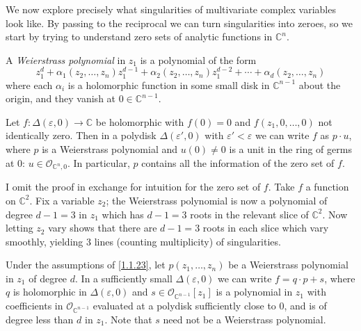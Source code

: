 We now explore precisely what singularities of multivariate complex variables look like. By passing to the reciprocal we can turn singularities into zeroes, so we start by trying to understand zero sets of analytic functions in $\mathbb{C} ^n$.

\begin{definition}\label{1.1.22}
	A \emph{Weierstrass polynomial} in $z_1$ is a polynomial of the form
	\[
		z_1^d+\alpha_1(z_2, \ldots ,z_n)z_1^{d-1} +\alpha _2(z_2, \ldots ,z_n)z_1^{d-2} +\cdots +\alpha _d(z_2, \ldots ,z_n)
	\]
	where each $\alpha _i$ is a holomorphic function in some small disk in $\mathbb{C} ^{n-1} $ about the origin, and they vanish at $0\in\mathbb{C} ^{n-1} $.
\end{definition}

\begin{proposition}\label{1.1.23}
	Let $f : \Delta (\varepsilon ,0) \to \mathbb{C} $ be holomorphic with $f(0)=0$ and $f(z_1, 0,\ldots,0)$ not identically zero. Then in a polydisk $\Delta (\varepsilon ',0)$ with $\varepsilon '<\varepsilon $ we can write $f$ as $p\cdot u$, where $p$ is a Weierstrass polynomial and $u(0)\neq 0$ is a unit in the ring of germs at 0: $u\in \mathcal{O}_{\mathbb{C} ^n,0} $. In particular, $p$ contains all the information of the zero set of $f$.
\end{proposition}
I omit the proof in exchange for intuition for the zero set of $f$. Take $f$ a function on $\mathbb{C} ^2$. Fix a variable $z_2$; the Weierstrass polynomial is now a polynomial of degree $d-1=3$ in $z_1$ which has $d-1=3$ roots in the relevant slice of $\mathbb{C} ^2$. Now letting $z_2$ vary shows that there are $d-1=3$ roots in each slice which vary smoothly, yielding 3 lines (counting multiplicity) of singularities.

\begin{theorem}\label{1.1.24}
	Under the assumptions of \cref{1.1.23}, let $p(z_1, \ldots ,z_n)$ be a Weierstrass polynomial in $z_1$ of degree $d$. In a sufficiently small $\Delta (\varepsilon ,0)$ we can write $f=q\cdot p+s$, where $q$ is holomorphic in $\Delta (\varepsilon ,0)$ and $s\in \mathcal{O}_{\mathbb{C} ^{n-1}}[z_1] $ is a polynomial in $z_1$ with coefficients in $\mathcal{O}_{\mathbb{C} ^{n-1} } $ evaluated at a polydisk sufficiently close to $0$, and is of degree less than $d$ in $z_1$. Note that $s$ need not be a Weierstrass polynomial.
\end{theorem}

